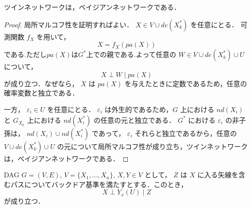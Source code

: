 \documentclass[uplatex, dvipdfmx]{jsarticle}
\begin{document}
\begin{prop}{}
  ツインネットワークは，ベイジアンネットワークである．
\end{prop}

\begin{proof}
  局所マルコフ性を証明すればよい．
  $X \in V \cup de(X_k^*)$ を任意にとる．
  可測関数 $f_X$ を用いて，
  \begin{equation}
    X = f_X(pa(X))
  \end{equation}
  である.ただし$pa(X)$は$G^*$上での親である.よって任意の $W \in V \cup de(X_k^*) \cup U$ について，
  \begin{equation}
    X \perp W \mid pa(X)
  \end{equation}
  が成り立つ．なぜなら， $X$ は $pa(X)$ を与えたときに定数であるため，任意の確率変数と独立である．
  
  一方， $\varepsilon_i \in U$ を任意にとる． $\varepsilon_i$ は外生的であるため，$G$ 上における $nd(X_i)$ と $G_{\bar{X_k}}$ 上における $nd(X_i^*)$ の任意の元と独立である．
  $G^*$ における $\varepsilon_i$ の非子孫は， $nd(X_i) \cup nd(X_i^*)$ であって， $\varepsilon_i$ それらと独立であるから，任意の $V \cup de(X_k^*) \cup U$ の元について局所マルコフ性が成り立ち，ツインネットワークは，ベイジアンネットワークである．
\end{proof}

\begin{thm}{}
  DAG $G = (V, E)$, $V = \{X_1, \dots, X_n\}$, $X, Y \in V$ として，
  $Z$ は $X$ に入る矢線を含むパスについてバックドア基準を満たすとする．このとき，
  \begin{equation}
    X \perp Y_x(U) \mid Z
  \end{equation}
  が成り立つ．
\end{thm}
\end{document}
